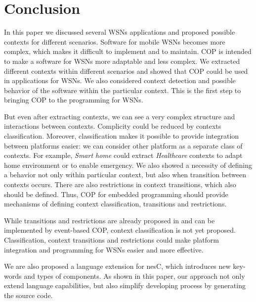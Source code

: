 \documentclass{ubicomp-ext}
\begin{document}
\section{Conclusion}
In this paper we discussed several WSNs applications and proposed possible contexts for different scenarios. Software for mobile WSNs becomes more complex, which makes it difficult to implement and to maintain. COP is intended to make a software  for WSNs more adaptable and less complex. We extracted different contexts within different scenarios and showed that COP could be used in applications for WSNs. We also considered context detection and possible behavior of the software within the particular context. This is  the first step to bringing COP to the programming for WSNs.

But even after extracting contexts, we can see a very complex structure and interactions between contexts. Complicity could be reduced by contexts classification. Moreover, classification makes it possible to provide integration between platforms easier: we can consider other platform as a separate class of contexts. For example, \textit{Smart home} could extract \textit{Healthcare} contexts to adapt home environment or to enable emergency. We also showed a necessity of defining a behavior not only within particular context, but also when transition between contexts occurs. There are also restrictions in context transitions, which also should be defined. Thus, COP for embedded programming should provide mechanisms of defining context classification, transitions and restrictions.

While transitions and restrictions are already proposed in \cite{kamina10} and can be implemented by event-based COP, context classification is not yet proposed. Classification, context transitions and restrictions could make platform integration and programming for WSNs easier and more effective.

We are also proposed a language extension for nesC, which introduces new key-words and types of components. As shown in this paper, our approach not only extend language capabilities, but also simplify developing process by generating the source code. 

\balance


\end{document}
